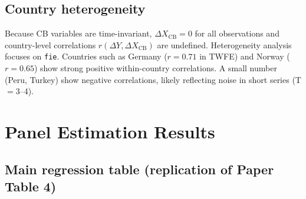 \documentclass[12pt,a4paper]{article}
\begin{document}
\subsection{Country heterogeneity}

Because CB variables are time-invariant, $\Delta X_{\text{CB}}=0$ for all
observations and country-level correlations $r(\Delta Y, \Delta X_{\text{CB}})$
are undefined. Heterogeneity analysis focuses on \texttt{fie}. Countries such
as Germany ($r=0.71$ in TWFE) and Norway ($r=0.65$) show strong positive
within-country correlations. A small number (Peru, Turkey) show negative
correlations, likely reflecting noise in short series (T$=$3--4).

\section{Panel Estimation Results}

\subsection{Main regression table (replication of Paper Table 4)}
\end{document}
